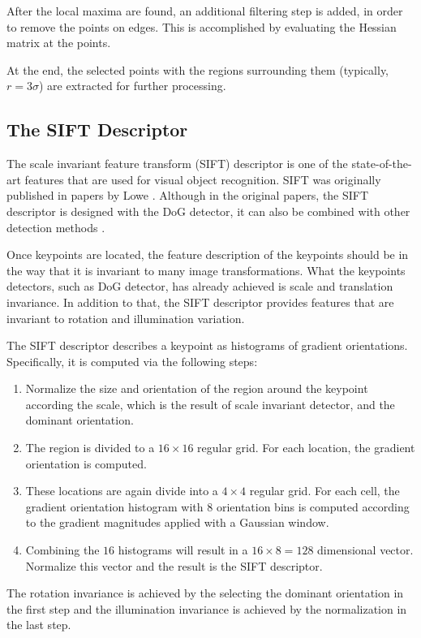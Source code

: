 \documentclass[12pt,final,twoside]{report}
\theoremstyle{plain}
\theoremstyle{definition}
\theoremstyle{remark}
\begin{document}
After the local maxima are found, an additional filtering step is added, in order to remove the points on edges. This is accomplished by evaluating the Hessian matrix at the points.

At the end, the selected points with the regions surrounding them (typically, $r = 3\sigma$) are extracted for further processing.

\subsection{The SIFT Descriptor}
The scale invariant feature transform (SIFT) descriptor is one of the state-of-the-art features that are used for visual object recognition. SIFT was originally published in papers by Lowe \cite{lowe_object_1999,lowe_distinctive_2004}. 
Although in the original papers, the SIFT descriptor is designed with the DoG detector, it can also be combined with other detection methods \cite{mikolajczyk_performance_2005}.

Once keypoints are located, the feature description of the keypoints should be in the way that it is invariant to many image transformations. What the keypoints detectors, such as DoG detector, has already achieved is scale and translation invariance. In addition to that, the SIFT descriptor provides features that are invariant to rotation and illumination variation.

The SIFT descriptor describes a keypoint as histograms of gradient orientations. Specifically, it is computed via the following steps:
\begin{enumerate}
  \item Normalize the size and orientation of the region around the keypoint according the scale, which is the result of scale invariant detector, and the dominant orientation.
  \item The region is divided to a $16 \times 16$ regular grid. For each location, the gradient orientation is computed.
  \item These locations are again divide into a $4 \times 4$ regular grid. For each cell, the gradient orientation histogram with 8 orientation bins is computed according to the gradient magnitudes applied with a Gaussian window.
  \item Combining the $16$ histograms will result in a $16 \times 8 = 128$ dimensional vector. Normalize this vector and the result is the SIFT descriptor.
\end{enumerate}

The rotation invariance is achieved by the selecting the dominant orientation in the first step and the illumination invariance is achieved by the normalization in the last step.
\end{document}
